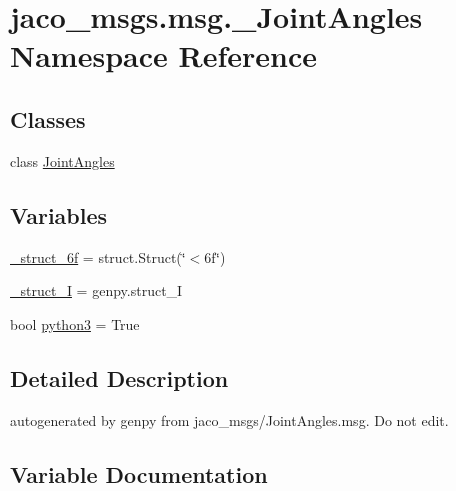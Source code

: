 \hypertarget{namespacejaco__msgs_1_1msg_1_1__JointAngles}{}\section{jaco\+\_\+msgs.\+msg.\+\_\+\+Joint\+Angles Namespace Reference}
\label{namespacejaco__msgs_1_1msg_1_1__JointAngles}
\subsection*{Classes}
\begin{DoxyCompactItemize}
\item 
class \hyperlink{classjaco__msgs_1_1msg_1_1__JointAngles_1_1JointAngles}{Joint\+Angles}
\end{DoxyCompactItemize}
\subsection*{Variables}
\begin{DoxyCompactItemize}
\item 
\hyperlink{namespacejaco__msgs_1_1msg_1_1__JointAngles_ae9b5ed97dcab150c6dfe83204ae71a4e}{\+\_\+struct\+\_\+6f} = struct.\+Struct(\char`\"{}$<$6f\char`\"{})
\item 
\hyperlink{namespacejaco__msgs_1_1msg_1_1__JointAngles_ae0f9d7d8832ccc5c76848d61e14df301}{\+\_\+struct\+\_\+I} = genpy.\+struct\+\_\+I
\item 
bool \hyperlink{namespacejaco__msgs_1_1msg_1_1__JointAngles_a882e8b791f0378ca25d87d80de0f25b0}{python3} = True
\end{DoxyCompactItemize}


\subsection{Detailed Description}
\begin{DoxyVerb}autogenerated by genpy from jaco_msgs/JointAngles.msg. Do not edit.\end{DoxyVerb}
 

\subsection{Variable Documentation}

